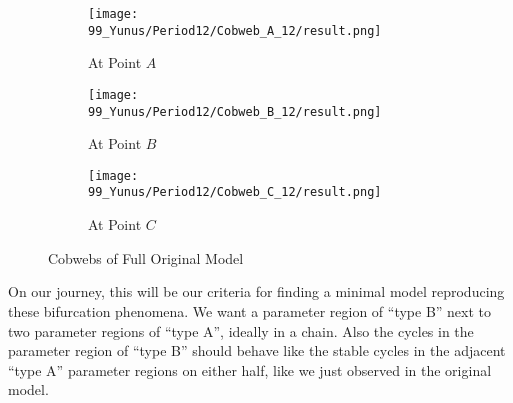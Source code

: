 \begin{figure}
    \centering
    \begin{subfigure}{0.3\textwidth}
        \centering
        \texttt{[image: 99\_Yunus/Period12/Cobweb\_A\_12/result.png]}
        \caption{At Point $A$}
        \label{fig:yunus.2pi.CobwebA12}
    \end{subfigure}
    \begin{subfigure}{0.3\textwidth}
        \centering
        \texttt{[image: 99\_Yunus/Period12/Cobweb\_B\_12/result.png]}
        \caption{At Point $B$}
        \label{fig:yunus.2pi.CobwebB12}
    \end{subfigure}
    \begin{subfigure}{0.3\textwidth}
        \centering
        \texttt{[image: 99\_Yunus/Period12/Cobweb\_C\_12/result.png]}
        \caption{At Point $C$}
        \label{fig:yunus.2pi.CobwebC12}
    \end{subfigure}
    \caption{Cobwebs of Full Original Model}
\end{figure}

On our journey, this will be our criteria for finding a minimal model reproducing these bifurcation phenomena.
We want a parameter region of ``type B'' next to two parameter regions of ``type A'', ideally in a chain.
Also the cycles in the parameter region of ``type B'' should behave like the stable cycles in the adjacent ``type A'' parameter regions on either half, like we just observed in the original model.
